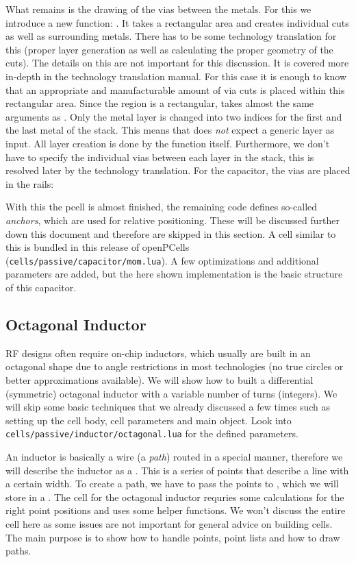 What remains is the drawing of the vias between the metals.
For this we introduce a new  function: .
It takes a rectangular area and creates individual cuts as well as surrounding metals.
There has to be some technology translation for this (proper layer generation as well as calculating the proper geometry of the cuts).
The details on this are not important for this discussion.
It is covered more in-depth in the technology translation manual.
For this case it is enough to know that an appropriate and manufacturable amount of via cuts is placed within this rectangular area.
Since the region is a rectangular,  takes almost the same arguments as .
Only the metal layer is changed into two indices for the first and the last metal of the stack.
This means that  does \emph{not} expect a generic layer as input.
All layer creation is done by the function itself.
Furthermore, we don't have to specify the individual vias between each layer in the stack, this is resolved later by the technology translation.
For the capacitor, the vias are placed in the rails:

With this the pcell is almost finished, the remaining code defines so-called \emph{anchors}, which are used for relative positioning.
These will be discussed further down this document and therefore are skipped in this section.
A cell similar to this is bundled in this release of openPCells (\texttt{cells/passive/capacitor/mom.lua}).
A few optimizations and additional parameters are added, but the here shown implementation is the basic structure of this capacitor.

\subsection{Octagonal Inductor}
RF designs often require on-chip inductors, which usually are built in an octagonal shape due to angle restrictions in most technologies (no true circles or
better approximations available).
We will show how to built a differential (symmetric) octagonal inductor with a variable number of turns (integers).
We will skip some basic techniques that we already discussed a few times such as setting up the cell body, cell parameters and main object.
Look into \texttt{cells/passive/inductor/octagonal.lua} for the defined parameters.

An inductor is basically a wire (a \emph{path}) routed in a special manner, therefore we will describe the inductor as a .
This is a series of points that describe a line with a certain width.
To create a path, we have to pass the points to , which we will store in a .
The cell for the octagonal inductor requries some calculations for the right point positions and uses some helper functions.
We won't discuss the entire cell here as some issues are not important for general advice on building cells.
The main purpose is to show how to handle points, point lists and how to draw paths.

